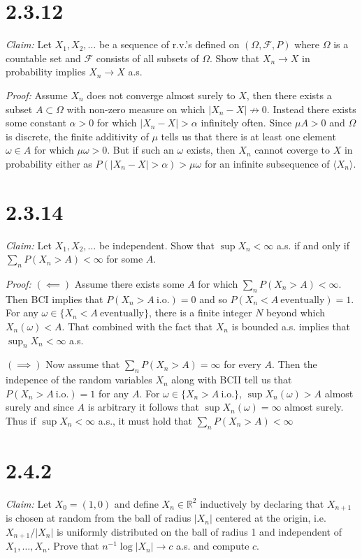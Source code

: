 \documentclass[10pt]{article}
\begin{document}
\section*{2.3.12}
\textit{Claim:} Let $X_1,X_2,\dots$ be a sequence of r.v.'s defined on
$(\Omega, \mathcal{F}, P)$ where $\Omega$ is a countable set and $\mathcal{F}$
consists of all subsets of $\Omega$. Show that $X_n \to X$ in probability
implies $X_n \to X$ a.s.

\textit{Proof:} Assume $X_n$ does not converge almost surely to $X$,
then there exists a subset $A \subset \Omega$ with non-zero measure
on which $\vert X_n - X \vert \not \to 0$.
Instead there exists some constant $\alpha > 0$ for which 
$\vert X_n - X \vert > \alpha$ infinitely often.
Since $\mu A > 0$ and $\Omega$
is discrete, the finite additivity of $\mu$ tells us that there is at least
one element $\omega \in A$ for which $\mu \omega > 0$.
But if such an $\omega$ exists, then $X_n$ cannot coverge to $X$ in probability
either as $P(\vert X_n - X \vert > \alpha) > \mu \omega$ 
for an infinite subsequence of $\langle X_n \rangle$.

\section*{2.3.14}
\textit{Claim:} Let $X_1,X_2,\dots$ be independent. 
Show that $\sup X_n < \infty$ a.s. if and only if
$\sum_n P(X_n > A) < \infty$ for some $A$.

\textit{Proof:} $(\impliedby)$ Assume there exists some $A$ for which
$\sum_n P(X_n > A) < \infty$. Then BCI implies that
$P(X_n > A \ \text{i.o.}) = 0$ and  so $P(X_n < A \ \text{eventually}) = 1$.
For any $\omega \in \{X_n < A \ \text{eventually}\}$,
there is a finite integer $N$ beyond which $X_n(\omega) < A$.
That combined with the fact that  $X_n$ is bounded a.s. 
implies that $\sup_n X_n < \infty$ a.s.

$(\implies)$ Now assume that $\sum_n P(X_n > A) = \infty$ for every $A$.
Then the indepence of the random variables $X_n$ along with BCII
tell us that $P(X_n > A \ \text{i.o.}) = 1$ for any $A$. 
For  $\omega \in \{X_n > A \ \text{i.o.}\}$,
$\sup X_n(\omega) > A$ almost surely and since $A$ is arbitrary 
it follows that $\sup X_n(\omega) = \infty$ almost surely.
Thus if $\sup X_n < \infty$ a.s., 
it must hold that $\sum_n P(X_n > A) < \infty$

\section*{2.4.2}
\textit{Claim:} Let $X_0=(1,0)$ and define $X_n \in \mathbb{R}^2$ inductively
by declaring that $X_{n+1}$ is chosen at random from the ball of radius
$\vert X_n \vert$ centered at the origin, i.e. $X_{n+1}/\vert X_n \vert$
is uniformly distributed on the ball of radius 1 and independent of
$X_1,\dots,X_n$. Prove that $n^{-1} \log \vert X_n \vert \to c$ a.s.
and compute $c$.
\end{document}
